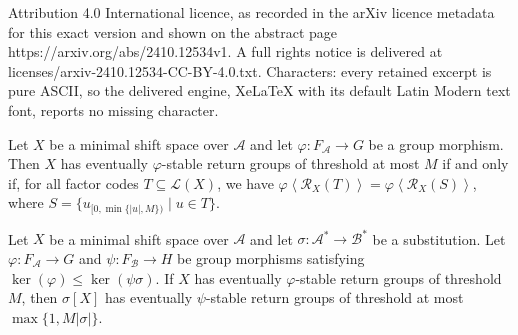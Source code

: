 \documentclass[10pt,a4paper]{amsart}
\newcommand*{\cA}{\mathcal{A}}
\newcommand*{\cB}{\mathcal{B}}
\newcommand*{\from}{\colon}
\newcommand*{\gen}[1]{\left\langle #1\right\rangle}
\newcommand*{\lang}{\mathcal{L}}
\newcommand*{\ret}{\mathcal{R}}
\begin{document}
Attribution 4.0 International licence, as recorded in the arXiv licence metadata for this exact version and shown on the abstract page https://arxiv.org/abs/2410.12534v1. A full rights notice is delivered at licenses/arxiv-2410.12534-CC-BY-4.0.txt. Characters: every retained excerpt is pure ASCII, so the delivered engine, XeLaTeX with its default Latin Modern text font, reports no missing character.
\begin{lemma}\label{L:stable return groups also works for sets}
    Let $X$ be a minimal shift space over $\cA$ and let $\varphi\from F_\cA \to G$ be a group morphism. Then $X$ has eventually $\varphi$-stable return groups of threshold at most $M$ if and only if, for all factor codes $T \subseteq \lang(X)$, we have $\varphi\gen{\ret_X(T)} = \varphi\gen{\ret_X(S)}$, where $S = \{u_{[0,\min\{|u|,M\})} \mid u \in T\}$.
\end{lemma}

\begin{proposition}\label{P:eventual stability preserved by substitution}
    Let $X$ be a minimal shift space over $\cA$ and let $\sigma\from \cA^* \to \cB^*$ be a substitution. Let $\varphi\from F_\cA \to G$ and $\psi\from F_\cB \to H$ be group morphisms satisfying $\ker(\varphi) \leq \ker(\psi\sigma)$. If $X$ has eventually $\varphi$-stable return groups of threshold $M$, then $\sigma[X]$ has eventually $\psi$-stable return groups of threshold at most $\max\{1,M|\sigma|\}$.
\end{proposition}
\end{document}
